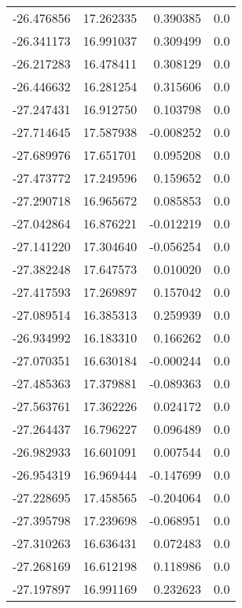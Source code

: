 \begin{tabular}{rrrr}
      -26.476856 &        17.262335 &    0.390385 &   0.0 \\
      -26.341173 &        16.991037 &    0.309499 &   0.0 \\
      -26.217283 &        16.478411 &    0.308129 &   0.0 \\
      -26.446632 &        16.281254 &    0.315606 &   0.0 \\
      -27.247431 &        16.912750 &    0.103798 &   0.0 \\
      -27.714645 &        17.587938 &   -0.008252 &   0.0 \\
      -27.689976 &        17.651701 &    0.095208 &   0.0 \\
      -27.473772 &        17.249596 &    0.159652 &   0.0 \\
      -27.290718 &        16.965672 &    0.085853 &   0.0 \\
      -27.042864 &        16.876221 &   -0.012219 &   0.0 \\
      -27.141220 &        17.304640 &   -0.056254 &   0.0 \\
      -27.382248 &        17.647573 &    0.010020 &   0.0 \\
      -27.417593 &        17.269897 &    0.157042 &   0.0 \\
      -27.089514 &        16.385313 &    0.259939 &   0.0 \\
      -26.934992 &        16.183310 &    0.166262 &   0.0 \\
      -27.070351 &        16.630184 &   -0.000244 &   0.0 \\
      -27.485363 &        17.379881 &   -0.089363 &   0.0 \\
      -27.563761 &        17.362226 &    0.024172 &   0.0 \\
      -27.264437 &        16.796227 &    0.096489 &   0.0 \\
      -26.982933 &        16.601091 &    0.007544 &   0.0 \\
      -26.954319 &        16.969444 &   -0.147699 &   0.0 \\
      -27.228695 &        17.458565 &   -0.204064 &   0.0 \\
      -27.395798 &        17.239698 &   -0.068951 &   0.0 \\
      -27.310263 &        16.636431 &    0.072483 &   0.0 \\
      -27.268169 &        16.612198 &    0.118986 &   0.0 \\
      -27.197897 &        16.991169 &    0.232623 &   0.0 \\

\end{tabular}
